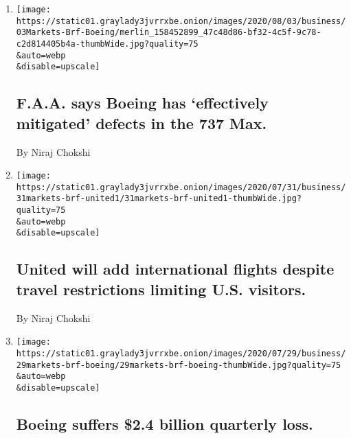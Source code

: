 \begin{enumerate}
\def\labelenumi{\arabic{enumi}.}
\item
  \href{/live/2020/08/03/business/stock-market-today-coronavirus/faa-says-boeing-has-effectively-mitigated-defects-in-the-737-max}{}

  \texttt{[image: https://static01.graylady3jvrrxbe.onion/images/2020/08/03/business/03Markets-Brf-Boeing/merlin\_158452899\_47c48d86-bf32-4c5f-9c78-c2d814405b4a-thumbWide.jpg?quality=75\\\&auto=webp\\\&disable=upscale]}

  \hypertarget{faa-says-boeing-has-effectively-mitigated-defects-in-the-737-max}{%
  \subsection{F.A.A. says Boeing has `effectively mitigated' defects in
  the 737
  Max.}\label{faa-says-boeing-has-effectively-mitigated-defects-in-the-737-max}}

  By Niraj Chokshi
\item
  \href{/live/2020/07/31/business/stock-market-today-coronavirus/united-will-add-international-flights-despite-travel-restrictions-limiting-us-visitors}{}

  \texttt{[image: https://static01.graylady3jvrrxbe.onion/images/2020/07/31/business/31markets-brf-united1/31markets-brf-united1-thumbWide.jpg?quality=75\\\&auto=webp\\\&disable=upscale]}

  \hypertarget{united-will-add-international-flights-despite-travel-restrictions-limiting-us-visitors}{%
  \subsection{United will add international flights despite travel
  restrictions limiting U.S.
  visitors.}\label{united-will-add-international-flights-despite-travel-restrictions-limiting-us-visitors}}

  By Niraj Chokshi
\item
  \href{/live/2020/07/29/business/stock-market-today-coronavirus/boeing-suffers-2-4-billion-quarterly-loss}{}

  \texttt{[image: https://static01.graylady3jvrrxbe.onion/images/2020/07/29/business/29markets-brf-boeing/29markets-brf-boeing-thumbWide.jpg?quality=75\\\&auto=webp\\\&disable=upscale]}

  \hypertarget{boeing-suffers-24-billion-quarterly-loss}{%
  \subsection{Boeing suffers \$2.4 billion quarterly
  loss.}\label{boeing-suffers-24-billion-quarterly-loss}}


\end{enumerate}
